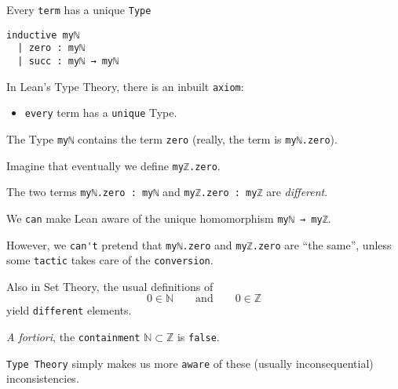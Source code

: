 \documentclass{beamer}
\begin{document}
\begin{frame}[fragile]{Every {\color{violet}\texttt{term}} has a unique {\color{violet}\texttt{Type}}}

\begin{verbatim}
inductive myℕ
  | zero : myℕ
  | succ : myℕ → myℕ
\end{verbatim}

In Lean's Type Theory, there is an inbuilt {\color{violet}\verb`axiom`}:

\vspace{-13pt}
\begin{itemize}
\setlength\itemsep{-12pt}
\item
  {\color{violet}\verb`every`} term has a {\color{violet}\verb`unique`} Type.
\end{itemize}

The Type {\color{violet}\verb`myℕ`} contains the term {\color{violet}\verb`zero`} (really, the term is {\color{violet}\verb`myℕ.zero`}).

Imagine that eventually we define {\color{violet}\verb`myℤ.zero`}.

The two terms {\color{violet}\verb`myℕ.zero : myℕ`} and {\color{violet}\verb`myℤ.zero : myℤ`} are {\emph{different}}.
\end{frame}

\begin{frame}[fragile]

We {\color{violet}\verb`can`} make Lean aware of the unique homomorphism {\color{violet}\verb`myℕ → myℤ`}.

However, we {\color{violet}\verb`can't`} pretend that {\color{violet}\verb`myℕ.zero`} and {\color{violet}\verb`myℤ.zero`} are ``the same'', unless some {\color{violet}\verb`tactic`} takes care of the {\color{violet}\verb`conversion`}.

Also in Set Theory, the usual definitions of
$$
  0 \in \mathbb{N} \qquad {\textrm{and}} \qquad 0 \in \mathbb{Z}
$$
yield {\color{violet}\verb`different`} elements.

{\emph{A fortiori}}, the {\color{violet}\verb`containment`} $\mathbb{N} \subset \mathbb{Z}$ is {\color{violet}\verb`false`}.

{\color{violet}\verb`Type Theory`} simply makes us more {\color{violet}\verb`aware`} of these (usually inconsequential) inconsistencies.
\end{frame}
\end{document}
